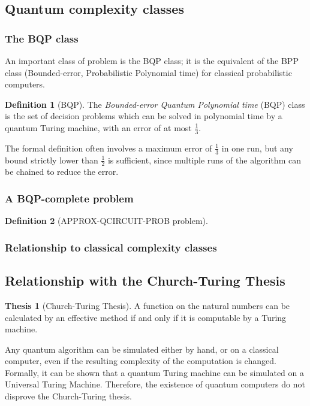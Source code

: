 \documentclass[12pt,a4paper]{article}
\theoremstyle{plain}
\theoremstyle{definition}
\newtheorem*{definition}{Definition}
\newtheorem*{thesis}{Thesis}
\begin{document}
\subsection{Quantum complexity classes}
\subsubsection{The BQP class}
An important class of problem is the BQP class; it is the equivalent of the BPP class (Bounded-error, Probabilistic Polynomial time) for classical probabilistic computers.

\begin{definition}[BQP] 
    The \emph{Bounded-error Quantum Polynomial time} (BQP) class is the set of decision problems which can be solved in polynomial time by a quantum Turing machine, with an error of at most $\frac{1}{3}$. 
\end{definition}
The formal definition often involves a maximum error of $\frac{1}{3}$ in one run, but any bound strictly lower than $\frac{1}{2}$ is sufficient, since multiple runs of the algorithm can be chained to reduce the error.

\subsubsection{A BQP-complete problem}
\begin{definition}[APPROX-QCIRCUIT-PROB problem]
    
\end{definition}

\subsubsection{Relationship to classical complexity classes}


\subsection{Relationship with the Church-Turing Thesis}
\begin{thesis}[Church-Turing Thesis]
    A function on the natural numbers can be calculated by an effective method if and only if it is computable by a Turing machine.
\end{thesis}

Any quantum algorithm can be simulated either by hand, or on a classical computer, even if the resulting complexity of the computation is changed. Formally, it can be shown that a quantum Turing machine can be simulated on a Universal Turing Machine. Therefore, the existence of quantum computers do not disprove the Church-Turing thesis.
\end{document}
